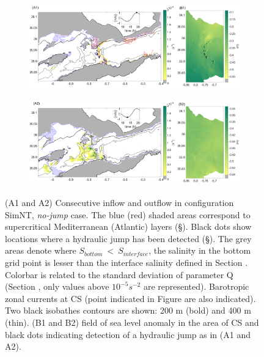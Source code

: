 \begin{figure}[!h]
 \centering
 
 \begin{subfigure}{\linewidth}
\centering
\includegraphics[width=1\linewidth]{./GBR3D/ME2_19h_p.png}
\end{subfigure}
 
 \begin{subfigure}{\linewidth}
\centering
\includegraphics[width=\linewidth]{./GBR3D/ME2_13h_p.png}
\end{subfigure}
\caption [Supercritical flow, location of hydraulic jump, standard deviation of parameter $Q$ in SimNT.]{ (A1 and A2) Consecutive inflow and outflow in configuration SimNT, \textit{no-jump} case. The blue (red) shaded areas correspond to supercritical Mediterranean (Atlantic) layers (\S {}). Black dots show locations where a hydraulic jump has been detected (\S {}). The grey areas denote where $S_{bottom}\ <\ S_{interface}$, the salinity in the bottom grid point is lesser than the interface salinity defined in Section . Colorbar is related to the standard deviation of parameter Q (Section , only values above $10^{-5} s^{-2}$ are represented). Barotropic zonal currents at CS (point indicated in Figure  are also indicated). Two black isobathes contours are shown: 200 m (bold) and 400 m (thin). (B1 and B2) field of sea level anomaly in the area of CS and black dots indicating detection of a hydraulic jump as in (A1 and A2).}
\label{FigHCN}
\end{figure}


